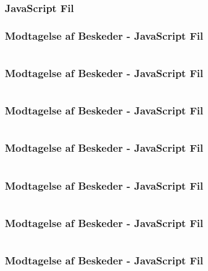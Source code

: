 \subsubsection{JavaScript Fil}
\begin{frame}
    \frametitle{Modtagelse af Beskeder - JavaScript Fil}
    \vspace{-1mm}
    \inputminted[fontsize=\footnotesize,highlightlines={}]{javascript}{../src/frontend/part4_recv/logic.js}
\end{frame}
\begin{frame}
    \frametitle{Modtagelse af Beskeder - JavaScript Fil}
    \vspace{-1mm}
    \inputminted[fontsize=\footnotesize,highlightlines={1}]{javascript}{../src/frontend/part4_recv/logic.js}
\end{frame}
\begin{frame}
    \frametitle{Modtagelse af Beskeder - JavaScript Fil}
    \vspace{-1mm}
    \inputminted[fontsize=\footnotesize,highlightlines={2}]{javascript}{../src/frontend/part4_recv/logic.js}
\end{frame}
\begin{frame}
    \frametitle{Modtagelse af Beskeder - JavaScript Fil}
    \vspace{-1mm}
    \inputminted[fontsize=\footnotesize,highlightlines={5}]{javascript}{../src/frontend/part4_recv/logic.js}
\end{frame}
\begin{frame}
    \frametitle{Modtagelse af Beskeder - JavaScript Fil}
    \vspace{-1mm}
    \inputminted[fontsize=\footnotesize,highlightlines={6,13}]{javascript}{../src/frontend/part4_recv/logic.js}
\end{frame}
\begin{frame}
    \frametitle{Modtagelse af Beskeder - JavaScript Fil}
    \vspace{-1mm}
    \inputminted[fontsize=\footnotesize,highlightlines={7,9}]{javascript}{../src/frontend/part4_recv/logic.js}
\end{frame}
\begin{frame}
    \frametitle{Modtagelse af Beskeder - JavaScript Fil}
    \vspace{-1mm}
    \inputminted[fontsize=\footnotesize,highlightlines={10}]{javascript}{../src/frontend/part4_recv/logic.js}
\end{frame}

